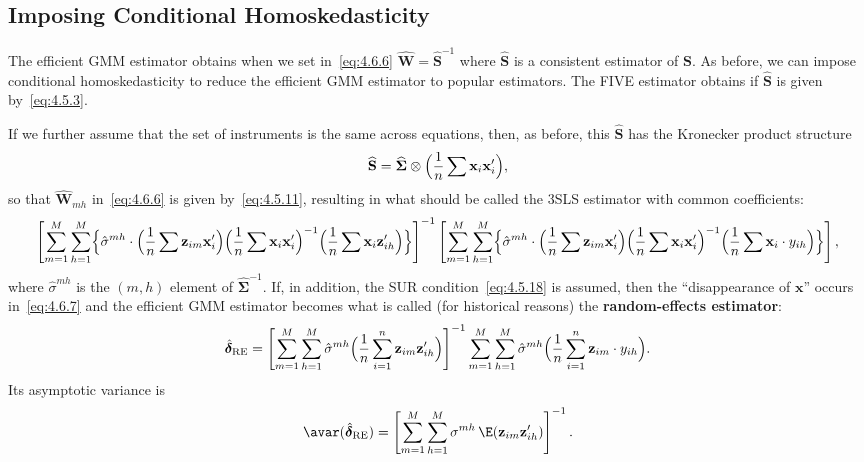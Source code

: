 \subsection*{Imposing Conditional Homoskedasticity}

The efficient GMM estimator obtains when we set in~\eqref{eq:4.6.6}
$\hat{\mathbf{W}} = \widehat{\mathbf{S}}^{-1}$ where $\widehat{\mathbf{S}}$
is a consistent estimator of $\mathbf{S}$. As before, we can impose conditional
homoskedasticity to reduce the efficient GMM estimator to popular estimators.
The FIVE estimator obtains if $\widehat{\mathbf{S}}$ is given by~\eqref{eq:4.5.3}.

If we further assume that the set of instruments is the same across equations,
then, as before, this $\widehat{\mathbf{S}}$ has the Kronecker product structure
\[
\widehat{\mathbf{S}} = \widehat{\boldsymbol{\Sigma}} \otimes
\Bigl(\frac{1}{n} \sum \mathbf{x}_i \mathbf{x}_i'\Bigr),
\]
so that $\hat{\mathbf{W}}_{mh}$ in~\eqref{eq:4.6.6} is given by~\eqref{eq:4.5.11},
resulting in what should be called the 3SLS estimator with common coefficients:
\begin{equation}
\left[\sum_{m=1}^{M} \sum_{h=1}^{M}
\Bigl\{\hat{\sigma}^{mh} \cdot
\Bigl(\frac{1}{n} \sum \mathbf{z}_{im} \mathbf{x}_i'\Bigr)
\Bigl(\frac{1}{n} \sum \mathbf{x}_i \mathbf{x}_i'\Bigr)^{-1}
\Bigl(\frac{1}{n} \sum \mathbf{x}_i \mathbf{z}_{ih}'\Bigr)
\Bigr\}\right]^{-1}
\left[\sum_{m=1}^{M} \sum_{h=1}^{M}
\Bigl\{\hat{\sigma}^{mh} \cdot
\Bigl(\frac{1}{n} \sum \mathbf{z}_{im} \mathbf{x}_i'\Bigr)
\Bigl(\frac{1}{n} \sum \mathbf{x}_i \mathbf{x}_i'\Bigr)^{-1}
\Bigl(\frac{1}{n} \sum \mathbf{x}_i \cdot y_{ih}\Bigr)
\Bigr\}\right],
\label{eq:4.6.7}
\end{equation}
where $\hat{\sigma}^{mh}$ is the $(m,h)$ element of
$\widehat{\boldsymbol{\Sigma}}^{-1}$.
If, in addition, the SUR condition~\eqref{eq:4.5.18} is assumed, then the
``disappearance of $\mathbf{x}$'' occurs in~\eqref{eq:4.6.7} and the efficient
GMM estimator becomes what is called (for historical reasons) the
\textbf{random-effects estimator}:
\begin{equation}
\hat{\boldsymbol{\delta}}_{\mathrm{RE}}
= \left[\sum_{m=1}^{M} \sum_{h=1}^{M}
\hat{\sigma}^{mh} \Bigl(\frac{1}{n} \sum_{i=1}^{n}
\mathbf{z}_{im} \mathbf{z}_{ih}'\Bigr)\right]^{-1}
\sum_{m=1}^{M} \sum_{h=1}^{M}
\hat{\sigma}^{mh} \Bigl(\frac{1}{n} \sum_{i=1}^{n}
\mathbf{z}_{im} \cdot y_{ih}\Bigr).
\label{eq:4.6.8}
\end{equation}
Its asymptotic variance is
\begin{equation}
\avar(\hat{\boldsymbol{\delta}}_{\mathrm{RE}})
= \left[\sum_{m=1}^{M} \sum_{h=1}^{M}
\sigma^{mh}\, \E(\mathbf{z}_{im} \mathbf{z}_{ih}')\right]^{-1}.
\label{eq:4.6.9}
\end{equation}
